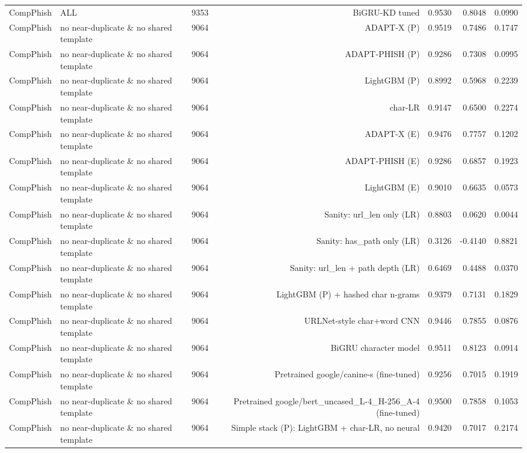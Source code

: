 \begin{table}[t]
\begin{tabular}{llrrrrr}
CompPhish & ALL & 9353 & BiGRU-KD tuned & 0.9530 & 0.8048 & 0.0990 \\
CompPhish & no near-duplicate \& no shared template & 9064 & ADAPT-X (P) & 0.9519 & 0.7486 & 0.1747 \\
CompPhish & no near-duplicate \& no shared template & 9064 & ADAPT-PHISH (P) & 0.9286 & 0.7308 & 0.0995 \\
CompPhish & no near-duplicate \& no shared template & 9064 & LightGBM (P) & 0.8992 & 0.5968 & 0.2239 \\
CompPhish & no near-duplicate \& no shared template & 9064 & char-LR & 0.9147 & 0.6500 & 0.2274 \\
CompPhish & no near-duplicate \& no shared template & 9064 & ADAPT-X (E) & 0.9476 & 0.7757 & 0.1202 \\
CompPhish & no near-duplicate \& no shared template & 9064 & ADAPT-PHISH (E) & 0.9286 & 0.6857 & 0.1923 \\
CompPhish & no near-duplicate \& no shared template & 9064 & LightGBM (E) & 0.9010 & 0.6635 & 0.0573 \\
CompPhish & no near-duplicate \& no shared template & 9064 & Sanity: url\_len only (LR) & 0.8803 & 0.0620 & 0.0044 \\
CompPhish & no near-duplicate \& no shared template & 9064 & Sanity: has\_path only (LR) & 0.3126 & -0.4140 & 0.8821 \\
CompPhish & no near-duplicate \& no shared template & 9064 & Sanity: url\_len + path depth (LR) & 0.6469 & 0.4488 & 0.0370 \\
CompPhish & no near-duplicate \& no shared template & 9064 & LightGBM (P) + hashed char n-grams & 0.9379 & 0.7131 & 0.1829 \\
CompPhish & no near-duplicate \& no shared template & 9064 & URLNet-style char+word CNN & 0.9446 & 0.7855 & 0.0876 \\
CompPhish & no near-duplicate \& no shared template & 9064 & BiGRU character model & 0.9511 & 0.8123 & 0.0914 \\
CompPhish & no near-duplicate \& no shared template & 9064 & Pretrained google/canine-s (fine-tuned) & 0.9256 & 0.7015 & 0.1919 \\
CompPhish & no near-duplicate \& no shared template & 9064 & Pretrained google/bert\_uncased\_L-4\_H-256\_A-4 (fine-tuned) & 0.9500 & 0.7858 & 0.1053 \\
CompPhish & no near-duplicate \& no shared template & 9064 & Simple stack (P): LightGBM + char-LR, no neural & 0.9420 & 0.7017 & 0.2174 \\

\end{tabular}
\end{table}
